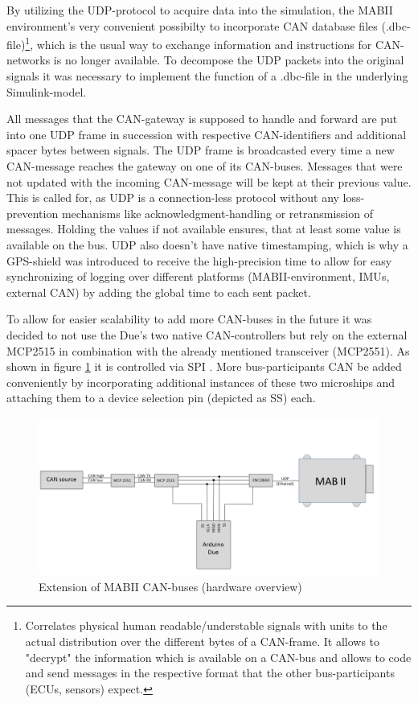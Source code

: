 \documentclass[ExampleMasters.tex]{subfiles}
\begin{document}
By utilizing the \gls{UDP}-protocol to acquire data into the simulation, the \gls{MABII} environment's very convenient possibilty to incorporate \gls{CAN} database files (.dbc-file)\footnote{Correlates physical human readable/understable signals with units to the actual distribution over the different bytes of a \gls{CAN}-frame. It allows to "decrypt" the information which is available on a \gls{CAN}-bus and allows to code and send messages in the respective format that the other bus-participants (ECUs, sensors) expect.}, which is the usual way to exchange information and instructions for \gls{CAN}-networks is no longer available. To decompose the \gls{UDP} packets into the original signals it was necessary to implement the function of a .dbc-file in the underlying Simulink-model. 

All messages that the CAN-gateway is supposed to handle and forward are put into one \gls{UDP} frame in succession with respective CAN-identifiers and additional spacer bytes between signals. The \gls{UDP} frame is broadcasted every time a new CAN-message reaches the gateway on one of its \gls{CAN}-buses. Messages that were not updated with the incoming \gls{CAN}-message will be kept at their previous value. This is called for, as \gls{UDP} is a connection-less protocol without any loss-prevention mechanisms like acknowledgment-handling or retransmission of messages. Holding the values if not available ensures, that at least some value is available on the bus. \gls{UDP} also doesn't have native timestamping, which is why a \gls{GPS}-shield was introduced to receive the high-precision time to allow for easy synchronizing of logging over different platforms (\gls{MABII}-environment, \gls{IMU}s, external \gls{CAN}) by adding the global time to each sent packet.

To allow for easier scalability to add more CAN-buses in the future it was decided to not use the Due's two native CAN-controllers but rely on the external MCP2515 in combination with the already mentioned transceiver (MCP2551). As shown in figure \ref{fig:can_extension} it is controlled via \gls{SPI} . More bus-participants \gls{CAN} be added conveniently by incorporating additional instances of these two microships and attaching them to a device selection pin (depicted as SS) each.\\




\begin{figure}[!htb]
	\centering
	\includegraphics[width=1\linewidth]{figures/can_extension}
	\caption{Extension of \gls{MABII} \gls{CAN}-buses (hardware overview)}
	\label{fig:can_extension}
\end{figure}
\end{document}
